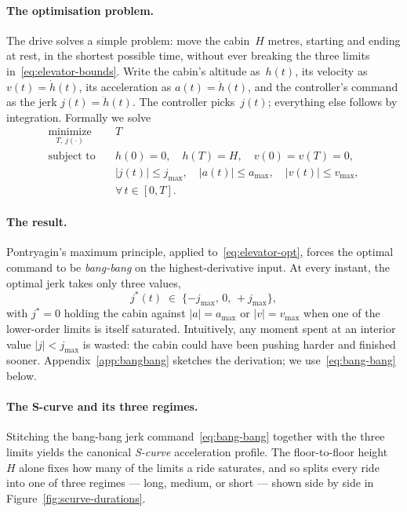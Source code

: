 \documentclass[manuscript,review,screen]{acmart}
\begin{document}
\paragraph{The optimisation problem.}
The drive solves a simple problem: move the cabin~$H$ metres,
starting and ending at rest, in the shortest possible time, without
ever breaking the three limits in~\eqref{eq:elevator-bounds}.
Write the cabin's altitude as~$h(t)$, its velocity as
$v(t)\!=\!\dot h(t)$, its acceleration as $a(t)\!=\!\ddot h(t)$,
and the controller's command as the jerk $j(t)\!=\!\dddot h(t)$.
The controller picks~$j(t)$; everything else follows by
integration.  Formally we solve
\begin{equation}
  \label{eq:elevator-opt}
  \begin{aligned}
    \underset{T,\,j(\cdot)}{\text{minimize}}\quad
      & T \\[3pt]
    \text{subject to}\quad
      & h(0)=0,\quad h(T)=H,\quad v(0)=v(T)=0, \\
      & |j(t)|\le j_{\max},\quad
        |a(t)|\le a_{\max},\quad
        |v(t)|\le v_{\max}, \\
      & \forall\,t\in[0,T].
  \end{aligned}
\end{equation}

\paragraph{The result.}
Pontryagin's maximum principle, applied
to~\eqref{eq:elevator-opt}, forces the optimal command to be
\emph{bang-bang} on the highest-derivative input.  At every
instant, the optimal jerk takes only three values,
\begin{equation}
  j^{*}(t)\;\in\;\{-j_{\max},\,0,\,+j_{\max}\},
  \label{eq:bang-bang}
\end{equation}
with $j^{*}\!=\!0$ holding the cabin against $|a|\!=\!a_{\max}$ or
$|v|\!=\!v_{\max}$ when one of the lower-order limits is itself
saturated.  Intuitively, any moment spent at an interior value
$|j|<j_{\max}$ is wasted: the cabin could have been pushing
harder and finished sooner.  Appendix~\ref{app:bangbang} sketches
the derivation; we use~\eqref{eq:bang-bang} below.


\paragraph{The S-curve and its three regimes.}
Stitching the bang-bang jerk command~\eqref{eq:bang-bang} together
with the three limits yields the canonical \emph{S-curve}
acceleration profile.  The floor-to-floor height~$H$ alone fixes
how many of the limits a ride saturates, and so splits every ride
into one of three regimes --- long, medium, or short --- shown
side by side in Figure~\ref{fig:scurve-durations}.
\end{document}
